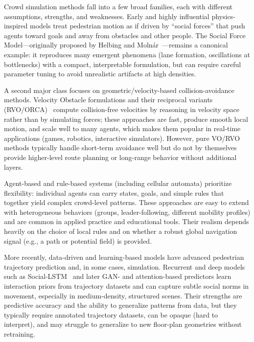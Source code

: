 \documentclass[conference]{IEEEtran}
\begin{document}
Crowd simulation methods fall into a few broad families, each with different
assumptions, strengths, and weaknesses. Early and highly influential
physics-inspired models treat pedestrian motion as if driven by ``social
forces'' that push agents toward goals and away from obstacles and other
people. The Social Force Model—originally proposed by Helbing and
Molnár~\cite{helbing1995social}—remains a canonical example: it reproduces many
emergent phenomena (lane formation, oscillations at bottlenecks) with a
compact, interpretable formulation, but can require careful parameter tuning to
avoid unrealistic artifacts at high densities.

A second major class focuses on geometric/velocity-based collision-avoidance
methods. Velocity Obstacle formulations and their reciprocal variants
(RVO/ORCA)~\cite{van2008reciprocal,berg2011reciprocal} compute collision-free
velocities by reasoning in velocity space rather than by simulating forces;
these approaches are fast, produce smooth local motion, and scale well to many
agents, which makes them popular in real-time applications (games, robotics,
interactive simulators). However, pure VO/RVO methods typically handle
short-term avoidance well but do not by themselves provide higher-level route
planning or long-range behavior without additional layers.

Agent-based and rule-based systems (including cellular automata) prioritize
flexibility: individual agents can carry states, goals, and simple rules that
together yield complex crowd-level patterns. These approaches are easy to
extend with heterogeneous behaviors (groups, leader-following, different
mobility profiles) and are common in applied practice and educational tools.
Their realism depends heavily on the choice of local rules and on whether a
robust global navigation signal (e.g., a path or potential field) is provided.

More recently, data-driven and learning-based models have advanced pedestrian
trajectory prediction and, in some cases, simulation. Recurrent and deep models
such as Social-LSTM~\cite{alahi2016social} and later GAN- and attention-based
predictors learn interaction priors from trajectory datasets and can capture
subtle social norms in movement, especially in medium-density, structured
scenes. Their strengths are predictive accuracy and the ability to generalize
patterns from data, but they typically require annotated trajectory datasets,
can be opaque (hard to interpret), and may struggle to generalize to new
floor-plan geometries without retraining.
\end{document}

